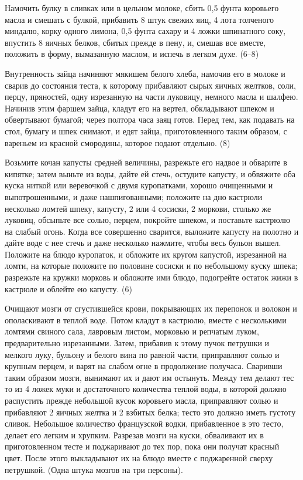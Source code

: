 
Намочить булку в сливках или в цельном молоке, сбить 0,5 фунта коровьего масла и смешать с булкой, прибавить 8 штук свежих яиц, 4 лота толченого миндалю, корку одного лимона, 0,5 фунта сахару и 4 ложки шпинатного соку, впустить 8 яичных белков, сбитых прежде в пену, и, смешав все вместе, положить в форму, вымазанную маслом, и испечь в легком духе. (6--8) 


Внутренность зайца начиняют мякишем белого хлеба, намочив его в молоке и сварив до состояния теста, к которому прибавляют сырых яичных желтков, соли, перцу, пряностей, одну изрезанную на части луковицу, немного масла и шалфею. Начинив этим фаршем зайца, кладут его на вертел, обкладывают шпеком и обвертывают бумагой; через полтора часа заяц готов. Перед тем, как подавать на стол, бумагу и шпек снимают, и едят зайца, приготовленного таким образом, с вареньем из красной смородины, которое подают отдельно. (8) 


Возьмите кочан капусты средней величины, разрежьте его надвое и обварите в кипятке; затем выньте из воды, дайте ей стечь, остудите капусту, и обвяжите оба куска ниткой или веревочкой с двумя куропатками, хорошо очищенными и выпотрошенными, и даже нашпигованными; положите на дно кастрюли несколько ломтей шпеку, капусту, 2 или 4 сосиски, 2 моркови, столько же луковиц, обсыпьте все солью, перцем, покройте шпеком, и поставьте кастрюлю на слабый огонь. Когда все совершенно сварится, выложите капусту на полотно и дайте воде с нее стечь и даже несколько нажмите, чтобы весь бульон вышел. Положите на блюдо куропаток, и обложите их кругом капустой, изрезанной на ломти, на которые положите по половине сосиски и по небольшому куску шпека; разрежьте на кружки морковь и обложите ими блюдо, подогрейте остаток жижи в кастрюле и облейте ею капусту. (6) 


Очищают мозги от сгустившейся крови, покрывающих их перепонок и волокон и ополаскивают в теплой воде. Потом кладут в кастрюлю, вместе с несколькими ломтями свиного сала, лавровым листом, морковью и репчатым луком, предварительно изрезанными. Затем, прибавив к этому пучок петрушки и мелкого луку, бульону и белого вина по равной части, приправляют солью и крупным перцем, и варят на слабом огне в продолжение получаса. Сваривши таким образом мозги, вынимают их и дают им остынуть. Между тем делают тес то из 4 ложек муки и достаточного количества теплой воды, в которой должно распустить прежде небольшой кусок коровьего масла, приправляют солью и прибавляют 2 яичных желтка и 2 взбитых белка; тесто это должно иметь густоту сливок. Небольшое количество французской водки, прибавленное в это тесто, делает его легким и хрупким. Разрезав мозги на куски, обваливают их в приготовленном тесте и поджаривают до тех пор, пока они получат красный цвет. После этого выкладывают их на блюдо вместе с поджаренной сверху петрушкой. (Одна штука мозгов на три персоны). 

